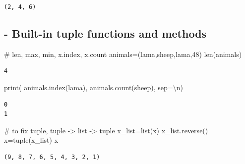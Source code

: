 \documentclass[
  letterpaper,
  DIV=11,
  numbers=noendperiod]{scrreprt}
\newenvironment{Shaded}{\begin{snugshade}}{\end{snugshade}}
\newcommand{\BuiltInTok}[1]{\textcolor[rgb]{0.00,0.23,0.31}{#1}}
\newcommand{\CharTok}[1]{\textcolor[rgb]{0.13,0.47,0.30}{#1}}
\newcommand{\CommentTok}[1]{\textcolor[rgb]{0.37,0.37,0.37}{#1}}
\newcommand{\DecValTok}[1]{\textcolor[rgb]{0.68,0.00,0.00}{#1}}
\newcommand{\NormalTok}[1]{\textcolor[rgb]{0.00,0.23,0.31}{#1}}
\newcommand{\OperatorTok}[1]{\textcolor[rgb]{0.37,0.37,0.37}{#1}}
\newcommand{\StringTok}[1]{\textcolor[rgb]{0.13,0.47,0.30}{#1}}
\begin{document}
\begin{verbatim}
(2, 4, 6)
\end{verbatim}

\subsection{- Built-in tuple functions and
methods}\label{built-in-tuple-functions-and-methods}

\begin{Shaded}
\begin{Highlighting}[]
\CommentTok{\# len, max, min, x.index, x.count}
\NormalTok{animals}\OperatorTok{=}\NormalTok{(}\StringTok{\textquotesingle{}lama\textquotesingle{}}\NormalTok{,}\StringTok{\textquotesingle{}sheep\textquotesingle{}}\NormalTok{,}\StringTok{\textquotesingle{}lama\textquotesingle{}}\NormalTok{,}\DecValTok{48}\NormalTok{)}
\BuiltInTok{len}\NormalTok{(animals)}
\end{Highlighting}
\end{Shaded}

\begin{verbatim}
4
\end{verbatim}

\begin{Shaded}
\begin{Highlighting}[]
\BuiltInTok{print}\NormalTok{(}
\NormalTok{    animals.index(}\StringTok{\textquotesingle{}lama\textquotesingle{}}\NormalTok{),}
\NormalTok{    animals.count(}\StringTok{\textquotesingle{}sheep\textquotesingle{}}\NormalTok{),}
\NormalTok{    sep}\OperatorTok{=}\StringTok{\textquotesingle{}}\CharTok{\textbackslash{}n}\StringTok{\textquotesingle{}}\NormalTok{)}
\end{Highlighting}
\end{Shaded}

\begin{verbatim}
0
1
\end{verbatim}

\begin{Shaded}
\begin{Highlighting}[]
\CommentTok{\# to fix tuple, tuple {-}\textgreater{} list {-}\textgreater{} tuple}
\NormalTok{x\_list}\OperatorTok{=}\BuiltInTok{list}\NormalTok{(x)}
\NormalTok{x\_list.reverse()}
\NormalTok{x}\OperatorTok{=}\BuiltInTok{tuple}\NormalTok{(x\_list)}
\NormalTok{x}
\end{Highlighting}
\end{Shaded}

\begin{verbatim}
(9, 8, 7, 6, 5, 4, 3, 2, 1)
\end{verbatim}
\end{document}
